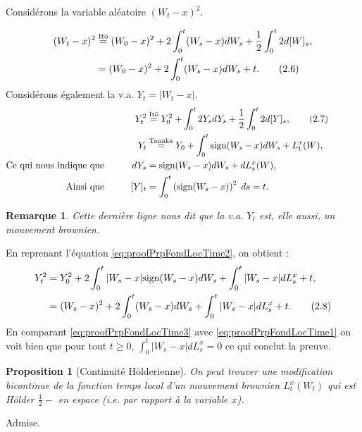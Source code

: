\documentclass[openany]{book}
\makeatletter
\newcommand{\1}{\mathbbm{1}}
\newcommand{\sign}{\text{sign}}
\renewenvironment{proof}[1][\textbf{\textit{Démonstration}}]{%
  \par\pushQED{\qed}%
  \normalfont\topsep6\p@\@plus6\p@\relax
  \trivlist\item[\hskip\labelsep
    #1\@addpunct{.}]\ignorespaces
}{%
  \popQED\endtrivlist\@endpefalse
}
\theoremstyle{thmfont}
\theoremstyle{deffont}
\theoremstyle{thmfont}
\newtheorem{prop}[prop]{Proposition}
\theoremstyle{deffont}
\newtheorem*{remark}{Remarque}
\makeatother
\begin{document}
\begin{proof}
    Considérons la variable aléatoire $(W_t - x)^2$.

    \begin{align*}
      (W_t -x)^2 &\overset{\text{Itō}}{=} (W_0-x)^2 + 2\int_0^t (W_s -x)dW_s + \dfrac{1}{2} \int_0^t 2 d[W]_s,\\
                 &= (W_0-x)^2 + 2\int_0^t (W_s -x)dW_s + t.  \tag{2.6}\refstepcounter{equation} \label{eq:proofPrpFondLocTime1}
    \end{align*}
    \indent Considérons également la v.a. $Y_t = |W_t-x|$.
    \begin{alignat*}{2}
     && Y_t^2 &\overset{\text{Itō}}{=} Y_0^2 + \int_0^t 2Y_s dY_s + \dfrac{1}{2} \int_0^t 2 d[Y]_s,  \tag{2.7}\refstepcounter{equation}\label{eq:proofPrpFondLocTime2} \\
     && Y_t &\overset{\text{Tanaka}}{=} Y_0 + \int_0^t \sign(W_s -x) dW_s + L_t^x(W),\\
      \text{Ce qui nous indique que}&&\qquad dY_s &=  \sign(W_s -x) dW_s + dL_s^x(W),\qquad\qquad\qquad\qquad\quad\\
     \text{Ainsi que}&& [Y]_t &= \int_0^t \left(\sign(W_s-x)\right)^2 \; ds = t.\\
    \end{alignat*}
    \begin{remark}Cette dernière ligne nous dit que la v.a. $Y_t$ est, elle aussi, un mouvement brownien.
    \end{remark}
    

    \noindent En reprenant l’équation \eqref{eq:proofPrpFondLocTime2}, on obtient :
    \begin{align*}
      Y_t^2 &= Y_0^2 + 2\int_0^t |W_s - x| \sign(W_s-x) dW_s + \int_0^t |W_s-x| dL_s^x + t,\\
      &= (W_s -x)^2 + 2\int_0^t (W_s -x) dW_s + \int_0^t |W_s -x| dL_s^x + t. \tag{2.8}\refstepcounter{equation}\label{eq:proofPrpFondLocTime3}
    \end{align*}
    En comparant \eqref{eq:proofPrpFondLocTime3} avec \eqref{eq:proofPrpFondLocTime1} on voit bien que pour tout $t\geq0$, $\int_0^t |W_s-x|dL_s^x = 0$ ce qui conclut la preuve.
\end{proof}


  \begin{prop}[Continuité Hölderienne]
    On peut trouver une modification bicontinue de la fonction temps local d'un mouvement brownien $L_t^x(W_t)$ qui est Hölder $\frac{1}{2}-$ en espace (i.e. par rapport à la variable $x$).
  \end{prop}
  \begin{proof}
    Admise.
\end{proof}
\end{document}
